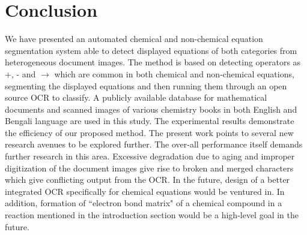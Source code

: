 \documentclass[12pt]{IEEEtran}
\begin{document}
\section{Conclusion}
\label{sc_conclu}
We have presented an automated chemical and non-chemical equation segmentation system able to
detect displayed equations of both categories from heterogeneous document images. 
The method is based on detecting operators as +, - and $ \rightarrow$ which are common in both chemical and non-chemical equations,
segmenting the displayed equations and then running them through an open source OCR to classify.
A publicly available database for mathematical documents and scanned images of various chemistry 
books in  both English and Bengali language are used in this study. 
The experimental results demonstrate the efficiency of our proposed method. 
The present work points to several new research avenues to be explored further. 
The over-all performance itself demands further research in this area. Excessive degradation due to aging and
improper digitization of the document images give rise to broken and merged characters which give conflicting output
from the OCR. In the future, design of a better integrated OCR specifically for
chemical equations would be ventured in.
In addition, formation of  ``electron bond matrix"  of a chemical compound in a reaction mentioned in 
the introduction section would be a high-level goal in the future.
\end{document}
